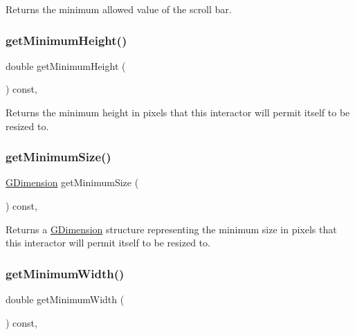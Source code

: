 Returns the minimum allowed value of the scroll bar. 

\mbox{\label{classGInteractor_aed4b0075fcc434499c3cb3e46896bda3}} 
\subsubsection{\texorpdfstring{get\+Minimum\+Height()}{getMinimumHeight()}}
{\footnotesize\ttfamily double get\+Minimum\+Height (\begin{DoxyParamCaption}{ }\end{DoxyParamCaption}) const\hspace{0.3cm}{\ttfamily [virtual]}, {\ttfamily [inherited]}}



Returns the minimum height in pixels that this interactor will permit itself to be resized to. 

\mbox{\label{classGInteractor_a66b5af0b32493b4d597ca0a3df2049ea}} 
\subsubsection{\texorpdfstring{get\+Minimum\+Size()}{getMinimumSize()}}
{\footnotesize\ttfamily \mbox{\hyperlink{structGDimension}{G\+Dimension}} get\+Minimum\+Size (\begin{DoxyParamCaption}{ }\end{DoxyParamCaption}) const\hspace{0.3cm}{\ttfamily [virtual]}, {\ttfamily [inherited]}}



Returns a \mbox{\hyperlink{structGDimension}{G\+Dimension}} structure representing the minimum size in pixels that this interactor will permit itself to be resized to. 

\mbox{\label{classGInteractor_a59e668114fe3d49d2a0f28deb258f7c8}} 
\subsubsection{\texorpdfstring{get\+Minimum\+Width()}{getMinimumWidth()}}
{\footnotesize\ttfamily double get\+Minimum\+Width (\begin{DoxyParamCaption}{ }\end{DoxyParamCaption}) const\hspace{0.3cm}{\ttfamily [virtual]}, {\ttfamily [inherited]}}




